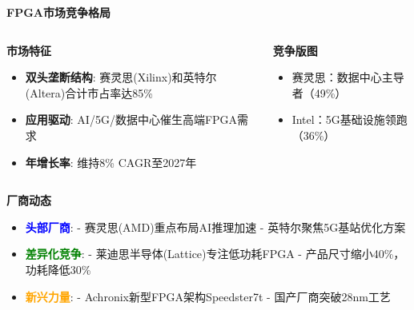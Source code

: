 \documentclass{beamer}
\begin{document}
\begin{frame}{\textbf{FPGA市场竞争格局}}
\begin{columns}[T]
\begin{block}{\textbf{市场特征}}
\begin{itemize}
\scriptsize
\item \textbf{双头垄断结构}: 赛灵思(Xilinx)和英特尔(Altera)合计市占率达85\%
\item \textbf{应用驱动}: AI/5G/数据中心催生高端FPGA需求 
\item \textbf{年增长率}: 维持8\% CAGR至2027年
\end{itemize}
\end{block}

\begin{block}{\textbf{竞争版图}}
\begin{itemize}
\tiny
\item 赛灵思：数据中心主导者（49\%）
\item Intel：5G基础设施领跑（36\%）
\end{itemize}
\end{block}
\end{columns}

\begin{block}{\textbf{厂商动态}}
\begin{itemize}
\footnotesize
\item \textcolor{blue}{\textbf{头部厂商}}: 
  - 赛灵思(AMD)重点布局AI推理加速
  - 英特尔聚焦5G基站优化方案
  
\item \textcolor{green}{\textbf{差异化竞争}}: 
  - 莱迪思半导体(Lattice)专注低功耗FPGA
  - 产品尺寸缩小40\%，功耗降低30\%

\item \textcolor{orange}{\textbf{新兴力量}}: 
  - Achronix新型FPGA架构Speedster7t
  - 国产厂商突破28nm工艺
\end{itemize}
\end{block}
\end{frame}
\end{document}
